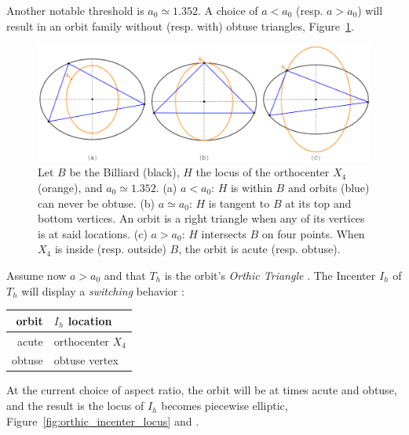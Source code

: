 Another notable threshold is $a_0\simeq{1.352}$. A choice of $a<a_0$ (resp. $a>a_0$) will result in an orbit family without (resp. with) obtuse triangles, Figure~\ref{fig:orthocenter_loci}. 

\begin{figure}[H]
    \centering
    \includegraphics[width=\textwidth]{pics/0045_ort_loci.pdf}
    \caption{Let $B$ be the Billiard (black), $H$ the locus of the orthocenter $X_4$ (orange), and $a_0\simeq{1.352}$. (a) $a<a_0$: $H$  is within $B$ and orbits (blue) can never be obtuse. (b) $a\simeq{a_0}$: $H$ is tangent to $B$ at its top and bottom vertices. An orbit is a right triangle when any of its vertices is at said locations. (c) $a>a_0$: $H$ intersects $B$ on four points. When $X_4$ is inside (resp. outside) $B$, the orbit is acute (resp. obtuse).}
    \label{fig:orthocenter_loci}
\end{figure}

Assume now $a>a_0$ and that $T_h$ is the orbit's {\em Orthic Triangle} \cite{mw}. The Incenter $I_h$ of $T_h$ will display a {\em switching} behavior \cite{coxeter67}:

\begin{center}
\begin{tabular}{r|l}
 orbit & $I_h$ location \\ 
 \hline
 acute & orthocenter $X_4$ \\  
 obtuse & obtuse vertex 
\end{tabular}
\end{center}

At the current choice of aspect ratio, the orbit will be at times acute and obtuse, and the result is the locus of $I_h$ becomes piecewise elliptic, Figure~\ref{fig:orthic_incenter_locus} and \cite[video \#6]{dsr_main_videos_2019}.

